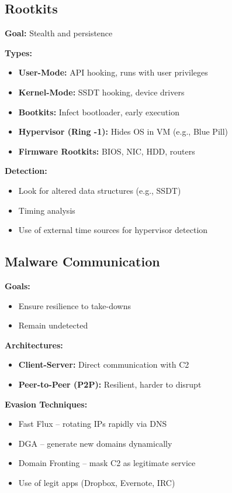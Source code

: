 \subsection{Rootkits}
{
\textbf{Goal:} Stealth and persistence

\textbf{Types:}
\begin{itemize}[noitemsep]
  \item \textbf{User-Mode:} API hooking, runs with user privileges
  \item \textbf{Kernel-Mode:} SSDT hooking, device drivers
  \item \textbf{Bootkits:} Infect bootloader, early execution
  \item \textbf{Hypervisor (Ring -1):} Hides OS in VM (e.g., Blue Pill)
  \item \textbf{Firmware Rootkits:} BIOS, NIC, HDD, routers
\end{itemize}

\textbf{Detection:}
\begin{itemize}[noitemsep]
  \item Look for altered data structures (e.g., SSDT)
  \item Timing analysis
  \item Use of external time sources for hypervisor detection
\end{itemize}
}

\subsection{Malware Communication}
{
\textbf{Goals:}
\begin{itemize}[noitemsep]
  \item Ensure resilience to take-downs
  \item Remain undetected
\end{itemize}

\textbf{Architectures:}
\begin{itemize}[noitemsep]
  \item \textbf{Client-Server:} Direct communication with C2
  \item \textbf{Peer-to-Peer (P2P):} Resilient, harder to disrupt
\end{itemize}

\textbf{Evasion Techniques:}
\begin{itemize}[noitemsep]
  \item Fast Flux – rotating IPs rapidly via DNS
  \item DGA – generate new domains dynamically
  \item Domain Fronting – mask C2 as legitimate service
  \item Use of legit apps (Dropbox, Evernote, IRC)
\end{itemize}
}

